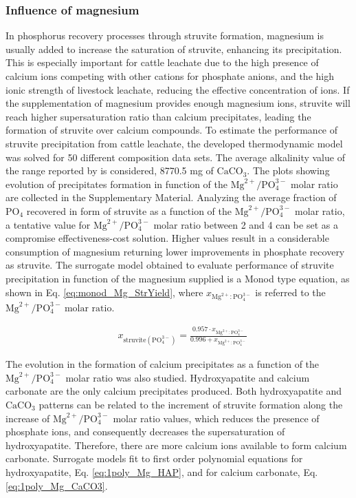 \documentclass[10pt,a4paper]{article}
\begin{document}
\subsubsection{Influence of magnesium} \label{inf_Mg}
In phosphorus recovery processes through struvite formation, magnesium is usually added to increase the saturation of struvite, enhancing its precipitation. This is especially important for cattle leachate due to the high presence of calcium ions competing with other cations for phosphate anions, and the high ionic strength of livestock leachate, reducing the effective concentration of ions. If the supplementation of magnesium provides enough magnesium ions, struvite will reach higher supersaturation ratio than calcium precipitates, leading the formation of struvite over calcium compounds.
To estimate the performance of struvite precipitation from cattle leachate, the developed thermodynamic model was solved for 50 different composition data sets. The average alkalinity value of the range reported by  is considered, 8770.5 mg of $\text{CaCO}_{3}$.
The plots showing evolution of precipitates formation in function of the  $\text{Mg}^{2+}/\text{PO}_{4}^{3-}$ molar ratio are collected in the Supplementary Material. 
Analyzing the average fraction of $\text{PO}_{4}$ recovered in form of struvite as a function of the $\text{Mg}^{2+}/\text{PO}_{4}^{3-}$ molar ratio, a tentative value for $\text{Mg}^{2+}/\text{PO}_{4}^{3-}$ molar ratio between 2 and 4 can be set as a compromise effectiveness-cost solution. Higher values result in a considerable consumption of magnesium returning lower improvements in phosphate recovery as struvite.
The surrogate model obtained to evaluate performance of struvite precipitation in function of the magnesium supplied is a Monod type equation, as shown in Eq. \ref{eq:monod_Mg_StrYield}, where $x_{\text{Mg}^{2+}:\text{PO}_{4}^{3-}}$ is referred to the $\text{Mg}^{2+}/\text{PO}_{4}^{3-} \ \text{molar ratio}$.

\begin{align}
& x_{\text{struvite} \left(\text{PO}_{4}^{3-}\right)} = \frac{0.957 \cdot x_{\text{Mg}^{2+}:\text{PO}_{4}^{3-}}}{0.996 + x_{\text{Mg}^{2+}:\text{PO}_{4}^{3-}}} \label{eq:monod_Mg_StrYield} 
\end{align}

The evolution in the formation of calcium precipitates as a function of the $\text{Mg}^{2+}/\text{PO}_{4}^{3-}$ molar ratio was also studied. Hydroxyapatite and calcium carbonate are the only calcium precipitates produced.
Both hydroxyapatite and $\text{CaCO}_{3}$ patterns can be related to the increment of struvite formation along the increase of $\text{Mg}^{2+}/\text{PO}_{4}^{3-}$ molar ratio values, which reduces the presence of phosphate ions, and consequently decreases the supersaturation of hydroxyapatite. Therefore, there are more calcium ions available to form calcium carbonate. 
Surrogate models fit to first order polynomial equations for hydroxyapatite, Eq. \ref{eq:1poly_Mg_HAP}, and for calcium carbonate, Eq. \ref{eq:1poly_Mg_CaCO3}.
\end{document}

